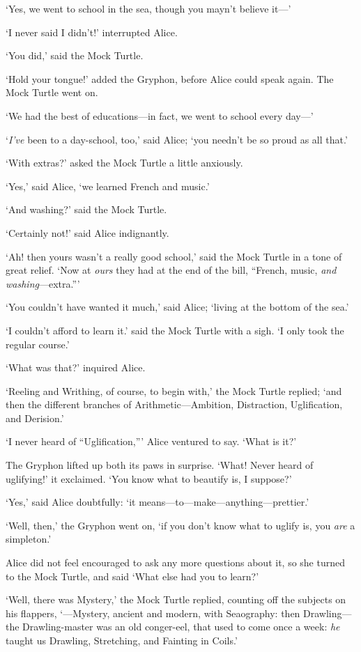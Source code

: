 \documentclass[12pt,openany]{memoir}
\begin{document}
`Yes, we went to school in the sea, though you mayn't believe it---'

`I never said I didn't!' interrupted Alice.

`You did,' said the Mock Turtle.

`Hold your tongue!' added the Gryphon, before Alice could speak again. The Mock Turtle went on.

`We had the best of educations---in fact, we went to school every day---'

`\textit{I've} been to a day-school, too,' said Alice; `you needn't be so proud as all that.'

`With extras?' asked the Mock Turtle a little anxiously.

`Yes,' said Alice, `we learned French and music.'

`And washing?' said the Mock Turtle.

`Certainly not!' said Alice indignantly.

`Ah! then yours wasn't a really good school,' said the Mock Turtle in a tone of great relief. `Now at \textit{ours} they had at the end of the bill, ``French, music, \textit{and washing}---extra.'''

`You couldn't have wanted it much,' said Alice; `living at the bottom of the sea.'

`I couldn't afford to learn it.' said the Mock Turtle with a sigh. `I only took the regular course.'

`What was that?' inquired Alice.

`Reeling and Writhing, of course, to begin with,' the Mock Turtle replied; `and then the different branches of Arithmetic---Ambition, Distraction, Uglification, and Derision.'

`I never heard of ``Uglification,''' Alice ventured to say. `What is it?'

The Gryphon lifted up both its paws in surprise. `What! Never heard of uglifying!' it exclaimed. `You know what to beautify is, I suppose?'

`Yes,' said Alice doubtfully: `it means---to---make---anything---prettier.'

`Well, then,' the Gryphon went on, `if you don't know what to uglify is, you \textit{are} a simpleton.'

Alice did not feel encouraged to ask any more questions about it, so she turned to the Mock Turtle, and said `What else had you to learn?'

`Well, there was Mystery,' the Mock Turtle replied, counting off the subjects on his flappers, `---Mystery, ancient and modern, with Seaography: then Drawling---the Drawling-master was an old conger-eel, that used to come once a week: \textit{he} taught us Drawling, Stretching, and Fainting in Coils.'
\end{document}
